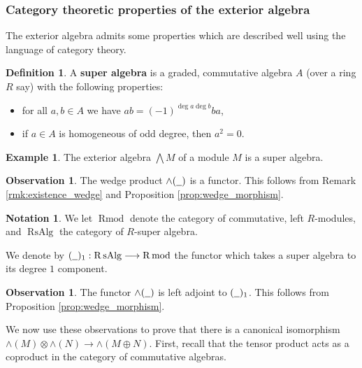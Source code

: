 \documentclass[12pt]{article}
\theoremstyle{plain}
\theoremstyle{definition}
\newtheorem{defn}[thm]{Definition} %
\newtheorem{notation}[thm]{Notation}
\newtheorem{example}[thm]{Example}
\newtheorem{observation}[thm]{Observation}
\newcommand{\und}[1]{\underline{\hspace{#1 cm}}}
\newcommand{\lto}{\longrightarrow}
\begin{document}
\subsubsection{Category theoretic properties of the exterior algebra}
The exterior algebra admits some properties which are described well using the language of category theory.
\begin{defn}
A \textbf{super algebra} is a graded, commutative algebra $A$ (over a ring $R$ say) with the following properties:
\begin{itemize}
\item for all $a,b \in A$ we have $ab = (-1)^{\operatorname{deg}a\operatorname{deg}b}ba$,
\item if $a \in A$ is homogeneous of odd degree, then $a^2 = 0$.
\end{itemize}
\end{defn}
\begin{example}
The exterior algebra $\bigwedge M$ of a module $M$ is a super algebra.
\end{example}
\begin{observation}
The wedge product $\wedge(\und{0.2})$ is a functor. This follows from Remark \ref{rmk:existence_wedge} and Proposition \ref{prop:wedge_morphism}.
\end{observation}
\begin{notation}
We let $\operatorname{R}\text{mod}$ denote the category of commutative, left $R$-modules, and $\operatorname{R}\text{sAlg}$ the category of $R$-super algebra.

We denote by $(\und{0.2})_1: \operatorname{R}\text{sAlg} \lto \operatorname{R}\text{mod}$ the functor which takes a super algebra to its degree $1$ component.
\end{notation}
\begin{observation}\label{obs:wedge_adjunction}
The functor $\wedge(\und{0.2})$ is left adjoint to $(\und{0.2})_1$. This follows from Proposition \ref{prop:wedge_morphism}.
\end{observation}
We now use these observations to prove that there is a canonical isomorphism $\wedge(M) \otimes \wedge(N) \lto \wedge(M \oplus N)$. First, recall that the tensor product acts as a coproduct in the category of commutative algebras.
\end{document}
